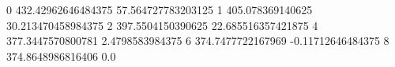 0 432.42962646484375 57.564727783203125
1 405.078369140625 30.213470458984375
2 397.5504150390625 22.685516357421875
4 377.3447570800781 2.4798583984375
6 374.7477722167969 -0.11712646484375
8 374.8648986816406 0.0
